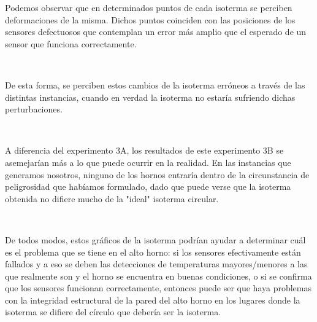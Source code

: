 Podemos observar que en determinados puntos de cada isoterma se perciben deformaciones de la misma. Dichos puntos coinciden con las posiciones de los sensores defectuosos que contemplan un error más amplio que el esperado de un sensor que funciona correctamente. 

\
 
De esta forma, se perciben estos cambios de la isoterma erróneos a través de las distintas instancias, cuando en verdad la isoterma no estaría sufriendo dichas perturbaciones.

\

A diferencia del experimento 3A, los resultados de este experimento 3B se asemejarían más a lo que puede ocurrir en la realidad. En las instancias que generamos nosotros, ninguno de los hornos entraría dentro de la circunstancia de peligrosidad que habíamos formulado, dado que puede verse que la isoterma obtenida no difiere mucho de la "ideal" isoterma circular. 

\

De todos modos, estos gráficos de la isoterma podrían ayudar a determinar cuál es el problema que se tiene en el alto horno: si los sensores efectivamente están fallados y a eso se deben las detecciones de temperaturas mayores/menores a las que realmente son y el horno se encuentra en buenas condiciones, o si se confirma que los sensores funcionan correctamente, entonces puede ser que haya problemas con la integridad estructural de la pared del alto horno en los lugares donde la isoterma se difiere del círculo que debería ser la isoterma.
